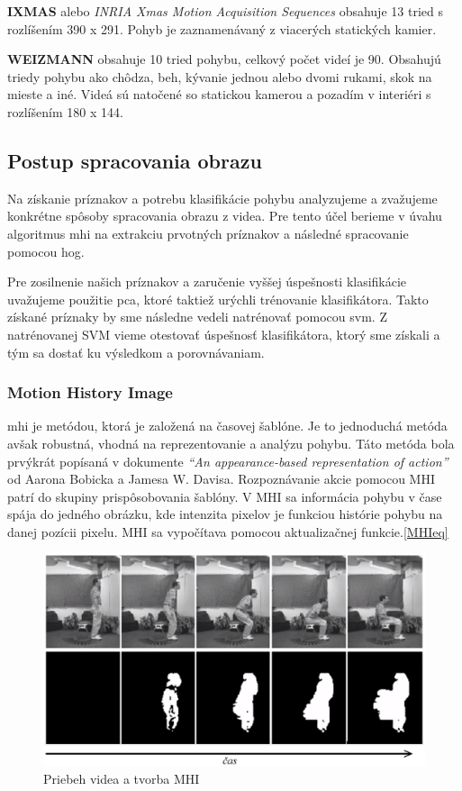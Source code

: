 \textbf{IXMAS} alebo \textit{INRIA Xmas Motion Acquisition Sequences} obsahuje 13 tried s rozlíšením 390 x 291. Pohyb je zaznamenávaný z viacerých statických kamier. \cite{c1}

\textbf{WEIZMANN} obsahuje 10 tried pohybu, celkový počet videí je 90. Obsahujú triedy pohybu ako chôdza, beh, kývanie jednou alebo dvomi rukami, skok na mieste a iné. Videá sú natočené so statickou kamerou a pozadím  v interiéri  s rozlíšením 180 x 144. \cite{c1}

\subsection{Postup spracovania obrazu}
Na získanie príznakov a potrebu klasifikácie pohybu analyzujeme a zvažujeme konkrétne spôsoby spracovania obrazu z videa. Pre tento účel berieme v úvahu algoritmus \acrfull{mhi} na extrakciu prvotných príznakov a následné spracovanie pomocou \acrfull{hog}. 

Pre zosilnenie našich príznakov a zaručenie vyššej úspešnosti klasifikácie uvažujeme použitie \acrfull{pca}, ktoré taktiež urýchli trénovanie klasifikátora. Takto získané príznaky by sme následne vedeli natrénovať pomocou \acrfull{svm}. Z natrénovanej SVM vieme otestovať úspešnosť klasifikátora, ktorý sme získali a tým sa dostať ku výsledkom a porovnávaniam. 

\subsubsection{Motion History Image} \label{MHIlabel}
\acrshort{mhi} je metódou, ktorá je založená na časovej šablóne. Je to jednoduchá metóda avšak robustná, vhodná na reprezentovanie a analýzu pohybu.\cite{c3}  Táto metóda bola prvýkrát popísaná v dokumente \textit{``An appearance-based representation of action''} od Aarona Bobicka a Jamesa W. Davisa.\cite{c2} Rozpoznávanie akcie pomocou MHI patrí do skupiny prispôsobovania šablóny. V MHI sa informácia pohybu v čase spája do jedného obrázku, kde intenzita pixelov je funkciou histórie pohybu na danej pozícii pixelu. MHI sa vypočítava pomocou aktualizačnej funkcie.\ref{MHIeq}

\begin{figure}[H]
  \centering
  \includegraphics[width=16cm]{img/MHIudacity.png}
  \caption{Priebeh videa a tvorba MHI}
  \label{MHIuda}
\end{figure}

